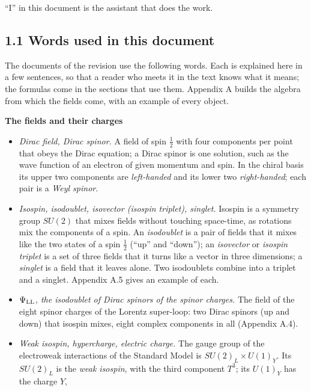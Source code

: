\documentclass[
  10pt,
]{article}
\providecommand{\tightlist}{%
  \setlength{\itemsep}{0pt}\setlength{\parskip}{0pt}}
\begin{document}
``I'' in this document is the assistant that does the work.

\hypertarget{words-used-in-this-document}{%
\subsection{1.1 Words used in this
document}\label{words-used-in-this-document}}

The documents of the revision use the following words. Each is explained
here in a few sentences, so that a reader who meets it in the text knows
what it means; the formulas come in the sections that use them. Appendix
A builds the algebra from which the fields come, with an example of
every object.

\textbf{The fields and their charges}

\begin{itemize}
\tightlist
\item
  \emph{Dirac field, Dirac spinor.} A field of spin \(\tfrac12\) with
  four components per point that obeys the Dirac equation; a Dirac
  spinor is one solution, such as the wave function of an electron of
  given momentum and spin. In the chiral basis its upper two components
  are \emph{left-handed} and its lower two \emph{right-handed}; each
  pair is a \emph{Weyl spinor}.
\item
  \emph{Isospin, isodoublet, isovector (isospin triplet), singlet.}
  Isospin is a symmetry group \(SU(2)\) that mixes fields without
  touching space-time, as rotations mix the components of a spin. An
  \emph{isodoublet} is a pair of fields that it mixes like the two
  states of a spin \(\tfrac12\) (``up'' and ``down''); an
  \emph{isovector} or \emph{isospin triplet} is a set of three fields
  that it turns like a vector in three dimensions; a \emph{singlet} is a
  field that it leaves alone. Two isodoublets combine into a triplet and
  a singlet. Appendix A.5 gives an example of each.
\item
  \emph{\(\Psi_{\rm LL}\), the isodoublet of Dirac spinors of the spinor
  charges.} The field of the eight spinor charges of the Lorentz
  super-loop: two Dirac spinors (up and down) that isospin mixes, eight
  complex components in all (Appendix A.4).
\item
  \emph{Weak isospin, hypercharge, electric charge.} The gauge group of
  the electroweak interactions of the Standard Model is
  \(SU(2)_L\times U(1)_Y\). Its \(SU(2)_L\) is the \emph{weak isospin},
  with the third component \(T^3\); its \(U(1)_Y\) has the charge \(Y\),

\end{itemize}
\end{document}

